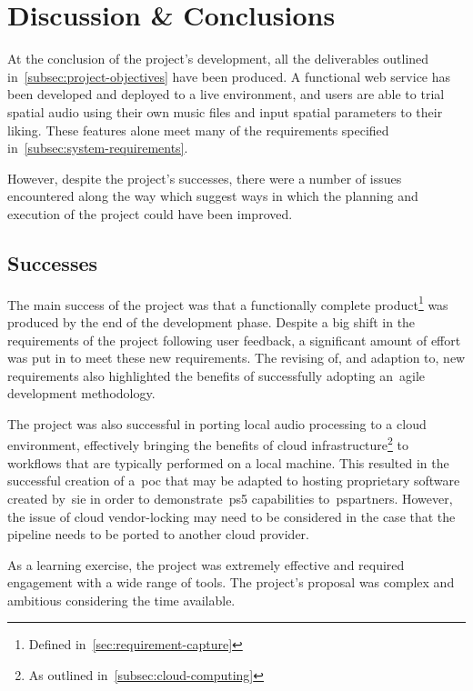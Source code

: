 \thispagestyle{plain}
\newpage
\section{Discussion \& Conclusions}\label{sec:discussion-conclusions}

\normalsize

At the conclusion of the project's development,
all the deliverables outlined in~\ref{subsec:project-objectives} have been produced.
A functional web service has been developed
and deployed to a live environment,
and users are able to trial spatial audio using their own music files and input spatial parameters to their liking.
These features alone meet many of the requirements specified in~\ref{subsec:system-requirements}.

However, despite the project's successes,
there were a number of issues encountered along the way
which suggest ways in which the planning and execution of the project could have been improved.

\subsection{Successes}\label{subsec:successes}

The main success of the project was that a functionally complete product\footnote{Defined in~\ref{sec:requirement-capture}} was produced by the end of the development phase.
Despite a big shift in the requirements of the project following user feedback,
a significant amount of effort was put in to meet these new requirements.
The revising of, and adaption to, new requirements also highlighted the benefits
of successfully adopting an~\gls{agile} development methodology.

The project was also successful in porting local audio processing to a cloud environment,
effectively bringing the benefits of cloud infrastructure\footnote{As outlined in~\ref{subsec:cloud-computing}} to workflows
that are typically performed on a local machine.
This resulted in the successful creation of a~\gls{poc} that
may be adapted
to hosting proprietary software created by~\gls{sie} in order to demonstrate~\gls{ps5} capabilities to~\glspl{pspartner}.
However,
the issue of cloud vendor-locking may need to be considered in the case
that the pipeline needs to be ported to another cloud provider.

As a learning exercise, the project was extremely effective and required engagement with a wide range of tools.
The project's proposal was complex and ambitious considering the time available.

